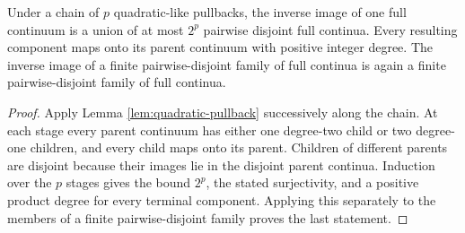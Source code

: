 \begin{corollary}\label{cor:finite-pullback}
Under a chain of \(p\) quadratic-like pullbacks, the inverse image of one full continuum is a union of at most \(2^p\) pairwise disjoint full continua.  Every resulting component maps onto its parent continuum with positive integer degree.  The inverse image of a finite pairwise-disjoint family of full continua is again a finite pairwise-disjoint family of full continua.
\end{corollary}

\begin{proof}
Apply Lemma \ref{lem:quadratic-pullback} successively along the chain.  At each stage every parent continuum has either one degree-two child or two degree-one children, and every child maps onto its parent.  Children of different parents are disjoint because their images lie in the disjoint parent continua.  Induction over the \(p\) stages gives the bound \(2^p\), the stated surjectivity, and a positive product degree for every terminal component.  Applying this separately to the members of a finite pairwise-disjoint family proves the last statement.
\end{proof}